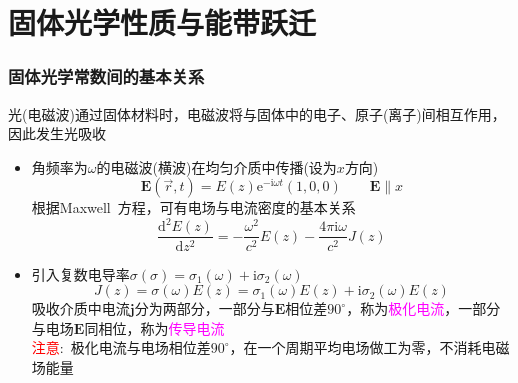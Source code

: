 \documentclass[cjk,slidestop,compress,mathserif,blue]{beamer}
\begin{document}

\section{固体光学性质与能带跃迁}
\frame
{
	\frametitle{固体光学常数间的基本关系}
	光(电磁波)通过固体材料时，电磁波将与固体中的电子、原子(离子)间相互作用，因此发生光吸收
	\begin{itemize}
		\item 角频率为$\omega$的电磁波(横波)在均匀介质中传播(设为$x$方向)
			\begin{displaymath}
				\mathbf{E}(\vec r,t)=E(z)\mathrm{e}^{-\mathrm{i}\omega t}(1,0,0)\qquad\mathbf{E}\parallel x
			\end{displaymath}
			根据\textrm{Maxwell~}方程，可有电场与电流密度的基本关系
			\begin{displaymath}
				\frac{\mathrm{d}^2E(z)}{\mathrm{d}z^2}=-\frac{\omega^2}{c^2}E(z)-\frac{4\pi\mathrm{i}\omega}{c^2}J(z)
			\end{displaymath}
		\item 引入复数电导率$\sigma(\sigma)=\sigma_1(\omega)+\mathrm{i}\sigma_2(\omega)$
			\begin{displaymath}
				J(z)=\sigma(\omega)E(z)=\sigma_1(\omega)E(z)+\mathrm{i}\sigma_2(\omega)E(z)
			\end{displaymath}
			吸收介质中电流$\mathbf{j}$分为两部分，一部分与$\mathbf{E}$相位差$90^{\circ}$，称为\textcolor{magenta}{极化电流}，一部分与电场$\mathbf{E}$同相位，称为\textcolor{magenta}{传导电流}\\
			\textcolor{red}{注意}:~极化电流与电场相位差$90^{\circ}$，在一个周期平均电场做工为零，不消耗电磁场能量
	\end{itemize}
}
\end{document}
